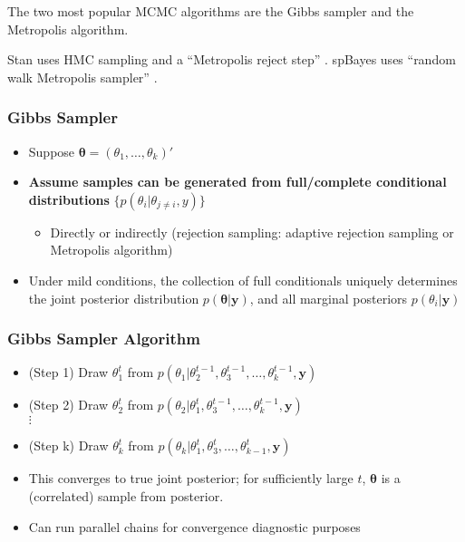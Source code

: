 The two most popular MCMC algorithms are the Gibbs sampler and the Metropolis algorithm.

Stan uses HMC sampling and a ``Metropolis reject step'' \citep{STANtheMan}. spBayes uses ``random walk Metropolis sampler'' \citep{Finley2015}.

\subsubsection{Gibbs Sampler}
        \begin{itemize} %
        \item Suppose $\pmb{\theta} = (\theta_{1}, \dots, \theta_{k})'$ 
        \item {\bf Assume samples can be generated from full/complete conditional distributions} $\{p(\theta_{i}|\theta_{j \neq i},y)\}$ 
              \begin{itemize}
              \item Directly or indirectly (rejection sampling: adaptive rejection sampling or Metropolis algorithm)
              \end{itemize}
        \item Under mild conditions, the collection of full conditionals uniquely determines the joint posterior distribution $p(\pmb{\theta}|\pmb{y})$, and all marginal posteriors $p(\theta_{i}|\pmb{y})$
        \end{itemize} %

\subsubsection{Gibbs Sampler Algorithm}
        \begin{itemize} %
        \item (Step 1) Draw $\theta_{1}^{t}$ from $p \left( \theta_{1}|\theta_{2}^{t-1}, \theta_{3}^{t-1},\dots,\theta_{k}^{t-1},\pmb{y} \right)$ 
        
        \item (Step 2) Draw $\theta_{2}^{t}$ from $p \left(\theta_{2}|\theta_{1}^{t}, \theta_{3}^{t-1},\dots,\theta_{k}^{t-1},\pmb{y} \right)$ \\
        $\vdots$ 
        \item (Step k) Draw $\theta_{k}^{t}$ from $p \left( \theta_{k}|\theta_{1}^{t}, \theta_{3}^{t},\dots,\theta_{k-1}^{t},\pmb{y} \right)$ \\
        \item This converges to true joint posterior; for sufficiently large $t$, $\pmb{\theta}$ is a (correlated) sample from posterior.
        \item Can run parallel chains for convergence diagnostic purposes
        \end{itemize} %

